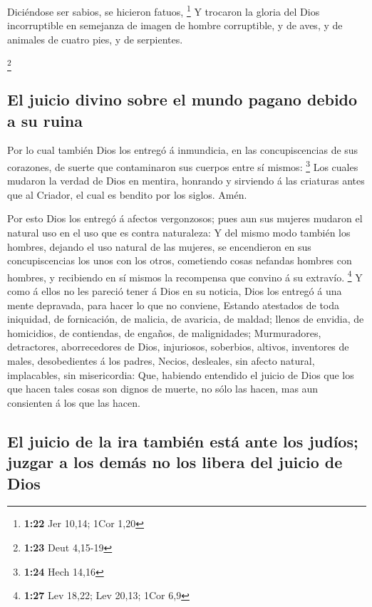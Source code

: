  Diciéndose ser sabios, se hicieron fatuos, \footnote{\textbf{1:22}
  Jer 10,14; 1Cor 1,20}  Y trocaron la gloria del Dios
incorruptible en semejanza de imagen de hombre corruptible, y de aves, y
de animales de cuatro pies, y de serpientes.

\footnote{\textbf{1:23} Deut 4,15-19}

\hypertarget{el-juicio-divino-sobre-el-mundo-pagano-debido-a-su-ruina}{%
\subsection{El juicio divino sobre el mundo pagano debido a su
ruina}\label{el-juicio-divino-sobre-el-mundo-pagano-debido-a-su-ruina}}

 Por lo cual también Dios los entregó á inmundicia, en
las concupiscencias de sus corazones, de suerte que contaminaron sus
cuerpos entre sí mismos: \footnote{\textbf{1:24} Hech 14,16}
 Los cuales mudaron la verdad de Dios en mentira,
honrando y sirviendo á las criaturas antes que al Criador, el cual es
bendito por los siglos. Amén.

 Por esto Dios los entregó á afectos vergonzosos; pues
aun sus mujeres mudaron el natural uso en el uso que es contra
naturaleza:  Y del mismo modo también los hombres,
dejando el uso natural de las mujeres, se encendieron en sus
concupiscencias los unos con los otros, cometiendo cosas nefandas
hombres con hombres, y recibiendo en sí mismos la recompensa que convino
á su extravío. \footnote{\textbf{1:27} Lev 18,22; Lev 20,13; 1Cor 6,9}
 Y como á ellos no les pareció tener á Dios en su
noticia, Dios los entregó á una mente depravada, para hacer lo que no
conviene,  Estando atestados de toda iniquidad, de
fornicación, de malicia, de avaricia, de maldad; llenos de envidia, de
homicidios, de contiendas, de engaños, de malignidades; 
Murmuradores, detractores, aborrecedores de Dios, injuriosos, soberbios,
altivos, inventores de males, desobedientes á los padres,
 Necios, desleales, sin afecto natural, implacables, sin
misericordia:  Que, habiendo entendido el juicio de Dios
que los que hacen tales cosas son dignos de muerte, no sólo las hacen,
mas aun consienten á los que las hacen.

\hypertarget{el-juicio-de-la-ira-tambiuxe9n-estuxe1-ante-los-juduxedos-juzgar-a-los-demuxe1s-no-los-libera-del-juicio-de-dios}{%
\subsection{El juicio de la ira también está ante los judíos; juzgar a
los demás no los libera del juicio de
Dios}\label{el-juicio-de-la-ira-tambiuxe9n-estuxe1-ante-los-juduxedos-juzgar-a-los-demuxe1s-no-los-libera-del-juicio-de-dios}}


